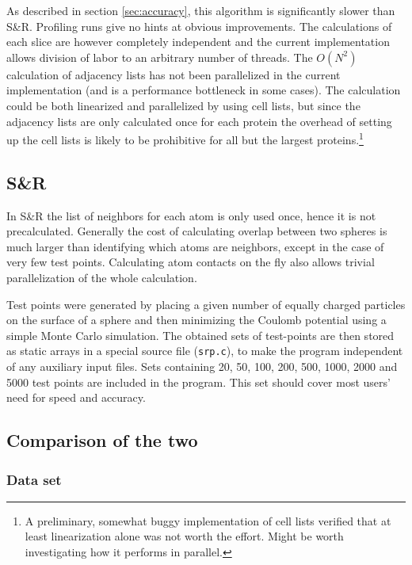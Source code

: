 \documentclass[a4paper,11pt]{article}
\begin{document}
As described in section \ref{sec:accuracy}, this algorithm is
significantly slower than S\&R. Profiling runs give no hints at
obvious improvements. The calculations of each slice are however
completely independent and the current implementation allows division
of labor to an arbitrary number of threads. The $O(N^2)$ calculation
of adjacency lists has not been parallelized in the current
implementation (and is a performance bottleneck in some cases). The
calculation could be both linearized and parallelized by using cell
lists, but since the adjacency lists are only calculated once for each
protein the overhead of setting up the cell lists is likely to be
prohibitive for all but the largest proteins.\footnote{A preliminary,
  somewhat buggy implementation of cell lists verified that at least
  linearization alone was not worth the effort. Might be worth
  investigating how it performs in parallel.}


\subsection{S\&R}

In S\&R the list of neighbors for each atom is only used once, hence
it is not precalculated. Generally the cost of calculating overlap
between two spheres is much larger than identifying which atoms are
neighbors, except in the case of very few test points. Calculating
atom contacts on the fly also allows trivial parallelization of the
whole calculation.

Test points were generated by placing a given number of equally
charged particles on the surface of a sphere and then minimizing the
Coulomb potential using a simple Monte Carlo simulation. The obtained
sets of test-points are then stored as static arrays in a special
source file (\texttt{srp.c}), to make the program independent of any
auxiliary input files. Sets containing 20, 50, 100, 200, 500, 1000,
2000 and 5000 test points are included in the program. This set should
cover most users' need for speed and accuracy.

\subsection{Comparison of the two}\label{sec:compare}

\subsubsection{Data set}\label{sec:dataset}
\end{document}

